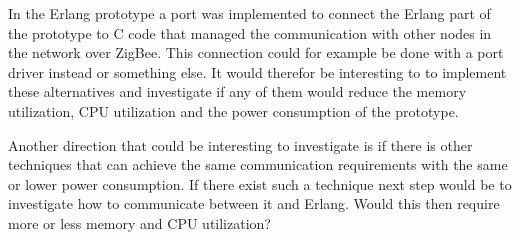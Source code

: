 In the Erlang prototype a port was implemented to connect the Erlang part of the prototype to C code that managed the communication with other nodes in the network over ZigBee. This connection could for example be done with a port driver instead or something else. It would therefor be interesting to to implement these alternatives and investigate if any of them would reduce the memory utilization, CPU utilization and the power consumption of the prototype.

Another direction that could be interesting to investigate is if there is other techniques that can achieve the same communication requirements with the same or lower power consumption. If there exist such a technique next step would be to investigate how to communicate between it and Erlang. Would this then require more or less memory and CPU utilization? 